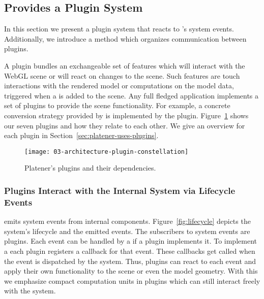 \documentclass[../../ClassicThesis.tex]{subfiles}
\begin{document}
\subsection{{\convertify} Provides a Plugin System}
\label{sec:plugin-system}


In this section we present a plugin system that reacts to
{\convertify}'s system events. Additionally, we introduce a
method which organizes communication between
plugins.


A plugin bundles an exchangeable set of features which will
interact with the WebGL scene or will react on changes to
the scene. Such features are touch interactions with the
rendered model or computations on the model data, triggered
when a  is added to the scene. Any full fledged
application implements a set of plugins to provide the scene
functionality. For example, a concrete conversion strategy
provided by {\platener} is implemented by the
 plugin.
Figure~\ref{fig:plugin-constellation} shows our seven
plugins and how they relate to each other. We give an
overview for each plugin in
Section~\ref{sec:platener-uses-plugins}.

\begin{figure}[h]
  \centering
  \texttt{[image: 03-architecture-plugin-constellation]}
  \caption{Platener's plugins and their dependencies.}
  \label{fig:plugin-constellation}
\end{figure}

\subsubsection{Plugins Interact with the Internal System via
  Lifecycle Events}


{\convertify} emits system events from internal components.
Figure~\ref{fig:lifecycle} depicts the system's lifecycle
and the emitted events. The subscribers to system events are
plugins. Each event can be handled by a
 if a plugin implements it. To
implement a  each plugin registers
a callback for that event. These callbacks get called when
the event is dispatched by the system. Thus, plugins
can react to each event and apply their own functionality to
the scene or even the model geometry. With this we emphasize
compact computation units in plugins which can still
interact freely with the system.
\end{document}
